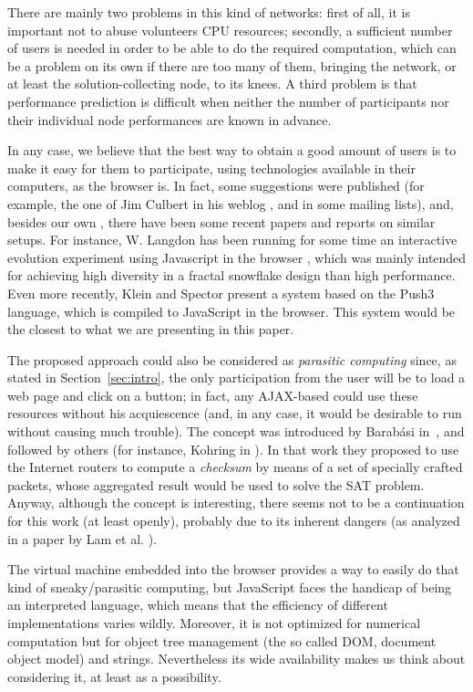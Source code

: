 \documentclass{llncs}
\begin{document}
There are mainly two problems in this kind of networks: first of all,
it is important not to abuse volunteers CPU resources; secondly, a
sufficient number of users is needed in order to be able to do the
required computation, which can be a problem on its own if there are
too many of them, bringing the network, or at least the
solution-collecting node, to its knees. A third problem is that
performance prediction is difficult when neither the number of
participants nor their individual node performances are known in
advance.

In any case, we believe that the best way to obtain a good amount of
users is to make it easy for them to participate, using technologies
available in their computers, as the browser is. In fact, some
suggestions were published (for example, the one of Jim Culbert in his
weblog \cite{ajax:dc}, and in some mailing lists), and, besides our
own \cite{gecco07:workshop:dcor}, there have been some recent papers
and reports on similar setups. For instance, W. Langdon has been
running for some time an interactive evolution experiment using
Javascript in the browser \cite{langdon:2005:metas}, which was mainly
intended for achieving high diversity in a fractal snowflake design
than high performance. Even more recently, Klein and Spector
\cite{unwitting-ec} present a system based on the Push3 language,
which is compiled to JavaScript in the browser. This system would be
the closest to what we are presenting in this paper. 

The proposed approach could also be considered as {\em parasitic
computing} since, as stated in Section~\ref{sec:intro}, the only
participation from the user will be to load a web page and click on a
button; in fact, any AJAX-based could use these resources without his
acquiescence (and, in any case, it would be desirable to run without
causing much trouble).  The concept was introduced by Barab\'asi
in~\cite{Barabasi2001Parasitic}, and followed by others (for instance,
Kohring in \cite{kohring-2003-14}).  In that work they proposed to use
the Internet routers to compute a {\em checksum} by means of a set of
specially crafted packets, whose aggregated result would be used to
solve the SAT problem. Anyway, although the concept is interesting,
there seems not to be a continuation for this work (at least openly),
probably due to its inherent dangers (as analyzed in a paper by Lam et
al.  \cite{puppetnets}).

The virtual machine embedded into the browser provides a way to easily
do that kind of  sneaky/parasitic computing, but JavaScript faces the
handicap of being an interpreted language, which means that the efficiency of different
implementations varies wildly. Moreover, it is not optimized for
numerical computation but for object tree 
management (the so called DOM, document
object model) and strings.
Nevertheless its wide availability makes us think about considering it, at
least as a possibility. 
\end{document}
